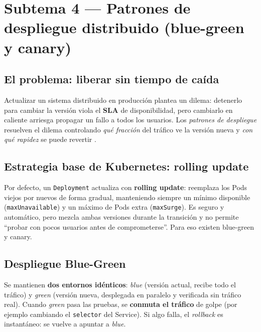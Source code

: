 \documentclass[11pt,a4paper]{article}
\begin{document}
\section{Subtema 4 --- Patrones de despliegue distribuido (blue-green y canary)}

\subsection{El problema: liberar sin tiempo de ca\'ida}

Actualizar un sistema distribuido en producci\'on plantea un dilema: detenerlo para cambiar la versi\'on viola el \textbf{SLA} de disponibilidad, pero cambiarlo en caliente arriesga propagar un fallo a todos los usuarios. Los \emph{patrones de despliegue} resuelven el dilema controlando \emph{qu\'e fracci\'on} del tr\'afico ve la versi\'on nueva y \emph{con qu\'e rapidez} se puede revertir \cite{richardson2018,newman2021}.

\subsection{Estrategia base de Kubernetes: rolling update}

Por defecto, un \texttt{Deployment} actualiza con \textbf{rolling update}: reemplaza los Pods viejos por nuevos de forma gradual, manteniendo siempre un m\'inimo disponible (\texttt{maxUnavailable}) y un m\'aximo de Pods extra (\texttt{maxSurge}). Es seguro y autom\'atico, pero mezcla ambas versiones durante la transici\'on y no permite ``probar con pocos usuarios antes de comprometerse''. Para eso existen blue-green y canary.

\subsection{Despliegue Blue-Green}

\begin{defbox}
Se mantienen \textbf{dos entornos id\'enticos}: \emph{blue} (versi\'on actual, recibe todo el tr\'afico) y \emph{green} (versi\'on nueva, desplegada en paralelo y verificada sin tr\'afico real). Cuando \emph{green} pasa las pruebas, se \textbf{conmuta el tr\'afico} de golpe (por ejemplo cambiando el \texttt{selector} del Service). Si algo falla, el \emph{rollback} es instant\'aneo: se vuelve a apuntar a \emph{blue}.
\end{defbox}
\end{document}
